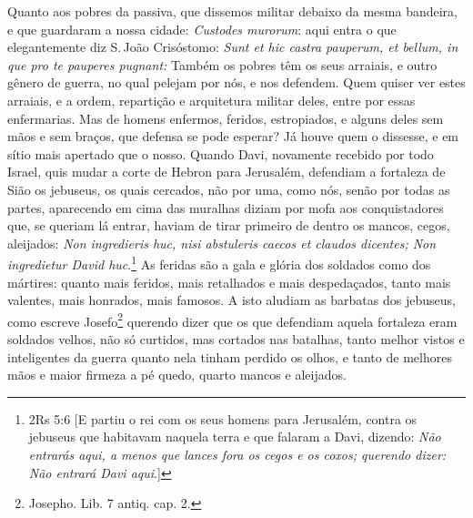 Quanto aos pobres da passiva, que dissemos militar debaixo da mesma
bandeira, e que guardaram a nossa cidade: \emph{Custodes murorum}: aqui
entra o que elegantemente diz S.\,João Crisóstomo: \emph{Sunt et hic
castra pauperum, et bellum, in que pro te pauperes pugnant:} Também os
pobres têm os seus arraiais, e outro gênero de guerra, no qual pelejam
por nós, e nos defendem. Quem quiser ver estes arraiais, e a ordem,
repartição e arquitetura militar deles, entre por essas enfermarias. Mas
de homens enfermos, feridos, estropiados, e alguns deles sem mãos e sem
braços, que defensa se pode esperar? Já houve quem o dissesse, e em
sítio mais apertado que o nosso. Quando Davi, novamente recebido por
todo Israel, quis mudar a corte de Hebron para Jerusalém, defendiam a
fortaleza de Sião os jebuseus, os quais cercados, não por uma, como nós,
senão por todas as partes, aparecendo em cima das muralhas diziam por
mofa aos conquistadores que, se queriam lá entrar, haviam de tirar
primeiro de dentro os mancos, cegos, aleijados: \emph{Non ingredieris
huc, nisi abstuleris caecos et claudos dicentes; Non ingredietur David
huc}.\footnote{2Rs 5:6 [E partiu o rei com os seus homens para Jerusalém, contra os jebuseus que habitavam naquela terra e que falaram a Davi, dizendo: \textit{Não entrarás aqui, a menos que lances fora os cegos e os coxos; querendo dizer: Não entrará Davi aqui}.]} As feridas são a gala e glória dos soldados como dos
mártires: quanto mais feridos, mais retalhados e mais despedaçados,
tanto mais valentes, mais honrados, mais famosos. A isto aludiam as
barbatas dos jebuseus, como escreve Josefo\footnote{Josepho. Lib. 7 antiq. cap. 2.} querendo dizer que os que
defendiam aquela fortaleza eram soldados velhos, não só curtidos, mas
cortados nas batalhas, tanto melhor vistos e inteligentes da guerra
quanto nela tinham perdido os olhos, e tanto de melhores mãos e maior
firmeza a pé quedo, quarto mancos e aleijados.

